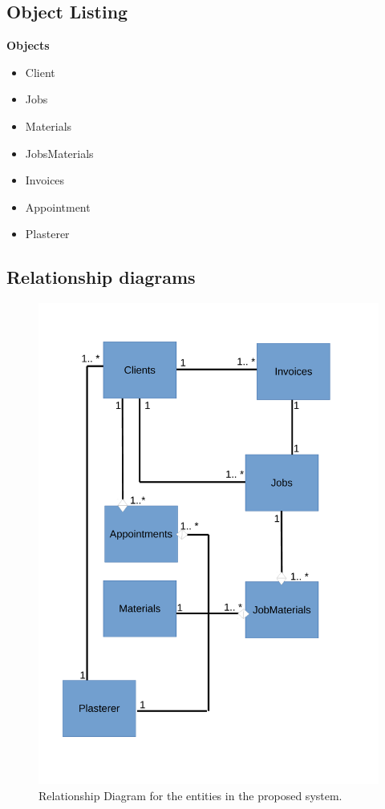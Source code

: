 \subsection{Object Listing}

\textbf{Objects}
	\begin{itemize}
		\item Client
		\item Jobs
		\item Materials
		\item JobsMaterials
		\item Invoices
		\item Appointment
		\item Plasterer
	\end{itemize}

\subsection{Relationship diagrams}

\begin{figure}[H]
\includegraphics[width=\textwidth]{./Analysis/images/relationshipDiagramObjectAnalysis.pdf}
    \caption{Relationship Diagram for the entities in the proposed system.} \label{fig:proposed_system_relationship_diagram}
\end{figure}



